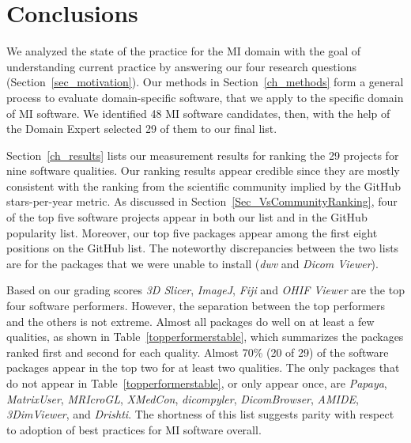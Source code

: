 \documentclass[11pt]{article}
\begin{document}
\section{Conclusions} \label{ch_conclusions}

We analyzed the state of the practice for the MI domain with the goal of
understanding current practice by answering our four research questions
(Section~\ref{sec_motivation}).  Our methods in Section~\ref{ch_methods} form a
general process to evaluate domain-specific software, that we apply to the
specific domain of MI software. We identified 48 MI software candidates, then,
with the help of the Domain Expert selected 29 of them to our final list. 

Section~\ref{ch_results} lists our measurement results for ranking the 29
projects for nine software qualities. Our ranking results appear credible since
they are mostly consistent with the ranking from the scientific community
implied by the GitHub stars-per-year metric. As discussed in
Section~\ref{Sec_VsCommunityRanking}, four of the top five software projects
appear in both our list and in the GitHub popularity list.  Moreover, our top
five packages appear among the first eight positions on the GitHub list.  The
noteworthy discrepancies between the two lists are for the packages that we were
unable to install (\textit{dwv} and \textit{Dicom Viewer}).

Based on our grading scores \textit{3D Slicer}, \textit{ImageJ}, \textit{Fiji}
and \textit{OHIF Viewer} are the top four software performers.  However, the
separation between the top performers and the others is not extreme.  Almost all
packages do well on at least a few qualities, as shown in
Table~\ref{topperformerstable}, which summarizes the packages ranked first and
second for each quality. Almost 70\% (20 of 29) of the software packages appear
in the top two for at least two qualities.  The only packages that do not appear
in Table~\ref{topperformerstable}, or only appear once, are \textit{Papaya},
\textit{MatrixUser}, \textit{MRIcroGL}, \textit{XMedCon}, \textit{dicompyler},
\textit{DicomBrowser}, \textit{AMIDE}, \textit{3DimViewer}, and
\textit{Drishti}. The shortness of this list suggests parity with respect to
adoption of best practices for MI software overall.
\end{document}
